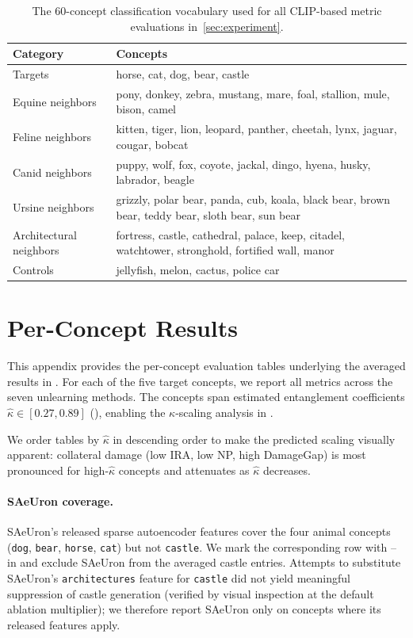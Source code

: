 \begin{table}[h]
\centering
\small
\begin{tabular}{p{3cm} p{10cm}}
\toprule
Category & Concepts \\
\midrule
Targets & horse, cat, dog, bear, castle \\
Equine neighbors & pony, donkey, zebra, mustang, mare, foal, stallion, mule, bison, camel \\
Feline neighbors & kitten, tiger, lion, leopard, panther, cheetah, lynx, jaguar, cougar, bobcat \\
Canid neighbors & puppy, wolf, fox, coyote, jackal, dingo, hyena, husky, labrador, beagle \\
Ursine neighbors & grizzly, polar bear, panda, cub, koala, black bear, brown bear, teddy bear, sloth bear, sun bear \\
Architectural neighbors & fortress, castle, cathedral, palace, keep, citadel, watchtower, stronghold, fortified wall, manor \\
Controls & jellyfish, melon, cactus, police car \\
\bottomrule
\end{tabular}
\caption{The 60-concept classification vocabulary used for all CLIP-based metric evaluations in~\cref{sec:experiment}.}
\label{tab:vocab}
\end{table}
\section{Per-Concept Results}
\label{app:per_concept_tables}

This appendix provides the per-concept evaluation tables underlying the averaged results in . For each of the five target concepts, we report all metrics across the seven unlearning methods. The concepts span estimated entanglement coefficients $\hat\kappa \in [0.27, 0.89]$ (), enabling the $\kappa$-scaling analysis in .

We order tables by $\hat\kappa$ in descending order to make the predicted scaling visually apparent: collateral damage (low IRA, low NP, high DamageGap) is most pronounced for high-$\hat\kappa$ concepts and attenuates as $\hat\kappa$ decreases.

\paragraph{SAeUron coverage.} 
SAeUron's released sparse autoencoder features cover the four animal concepts (\texttt{dog}, \texttt{bear}, \texttt{horse}, \texttt{cat}) but not \texttt{castle}. We mark the corresponding row with -- in  and exclude SAeUron from the averaged castle entries. Attempts to substitute SAeUron's \texttt{architectures} feature for \texttt{castle} did not yield meaningful suppression of castle generation (verified by visual inspection at the default ablation multiplier); we therefore report SAeUron only on concepts where its released features apply.


